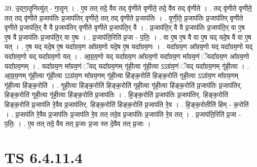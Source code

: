 \documentclass[17pt]{extarticle}
\begin{document}
39. उ॒द्‌गा॒तॄनित्यु॑त् - गा॒तॄन् । . ए॒व तत् तदे॒ वैव तद् वृ॑णीते वृणीते॒ तदे॒ वैव तद् वृ॑णीते । . तद् वृ॑णीते वृणीते॒ तत् तद् वृ॑णीते प्र॒जाप॑तिः प्र॒जाप॑तिर् वृणीते॒ तत् तद् वृ॑णीते प्र॒जाप॑तिः । . वृ॒णी॒ते॒ प्र॒जाप॑तिः प्र॒जाप॑तिर् वृणीते वृणीते प्र॒जाप॑ति॒र् वै वै प्र॒जाप॑तिर् वृणीते वृणीते प्र॒जाप॑ति॒र् वै । . प्र॒जाप॑ति॒र् वै वै प्र॒जाप॑तिः प्र॒जाप॑ति॒र् वा ए॒ष ए॒ष वै प्र॒जाप॑तिः प्र॒जाप॑ति॒र् वा ए॒षः । . प्र॒जाप॑ति॒रिति॑ प्र॒जा - प॒तिः॒ । . वा ए॒ष ए॒ष वै वा ए॒ष यद् यदे॒ष वै वा ए॒ष यत् । . ए॒ष यद् यदे॒ष ए॒ष यदा᳚ग्रय॒ण आ᳚ग्रय॒णो यदे॒ष ए॒ष यदा᳚ग्रय॒णः । . यदा᳚ग्रय॒ण आ᳚ग्रय॒णो यद् यदा᳚ग्रय॒णो यद् यदा᳚ग्रय॒णो यद् यदा᳚ग्रय॒णो यत् । . आ॒ग्र॒य॒णो यद् यदा᳚ग्रय॒ण आ᳚ग्रय॒णो यदा᳚ग्रय॒ण मा᳚ग्रय॒णं ॅयदा᳚ग्रय॒ण आ᳚ग्रय॒णो यदा᳚ग्रय॒णम् । . यदा᳚ग्रय॒ण मा᳚ग्रय॒णं ॅयद् यदा᳚ग्रय॒णम् गृ॑ही॒त्वा गृ॑ही॒त्वा ऽऽग्र॑य॒णं ॅयद् यदा᳚ग्रय॒णम् गृ॑ही॒त्वा । . आ॒ग्र॒य॒णम् गृ॑ही॒त्वा गृ॑ही॒त्वा ऽऽग्र॑य॒ण मा᳚ग्रय॒णम् गृ॑ही॒त्वा हि॑ङ्क॒रोति॑ हिङ्क॒रोति॑ गृही॒त्वा ऽऽग्र॑य॒ण मा᳚ग्रय॒णम् गृ॑ही॒त्वा हि॑ङ्क॒रोति॑ । . गृ॒ही॒त्वा हि॑ङ्क॒रोति॑ हिङ्क॒रोति॑ गृही॒त्वा गृ॑ही॒त्वा हि॑ङ्क॒रोति॑ प्र॒जाप॑तिः प्र॒जाप॑तिर्. हिङ्क॒रोति॑ गृही॒त्वा गृ॑ही॒त्वा हि॑ङ्क॒रोति॑ प्र॒जाप॑तिः । . हि॒ङ्क॒रोति॑ प्र॒जाप॑तिः प्र॒जाप॑तिर्. हिङ्क॒रोति॑ हिङ्क॒रोति॑ प्र॒जाप॑ति रे॒वैव प्र॒जाप॑तिर्. हिङ्क॒रोति॑ हिङ्क॒रोति॑ प्र॒जाप॑ति रे॒व । . हि॒ङ्क॒रोतीति॑ हिम् - क॒रोति॑ । . प्र॒जाप॑ति रे॒वैव प्र॒जाप॑तिः प्र॒जाप॑ति रे॒व तत् तदे॒व प्र॒जाप॑तिः प्र॒जाप॑ति रे॒व तत् । . प्र॒जाप॑ति॒रिति॑ प्र॒जा - प॒तिः॒ । . ए॒व तत् तदे॒ वैव तत् प्र॒जाः प्र॒जा स्त दे॒वैव तत् प्र॒जाः । \newline
\pagebreak
{}

\section{ TS 6.4.11.4 }
\end{document}
